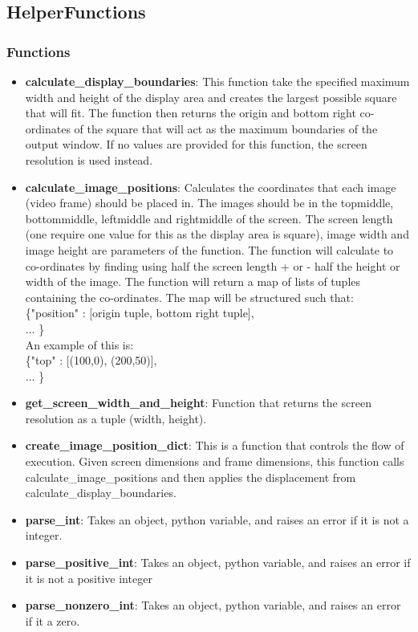 \documentclass{article}
\begin{document}
\subsection{HelperFunctions}
\subsubsection{Functions}

\begin{itemize}
	\item \textbf{calculate\_display\_boundaries}: This function take the specified maximum width and height of the display area and creates the largest possible square that will fit. The function then returns the origin and bottom right co-ordinates of the square that will act as the maximum boundaries of the output window. If no values are provided for this function, the screen resolution is used instead.
	
	\item \textbf{calculate\_image\_positions}: Calculates the co\-ordinates that each image (video frame) should be placed in. The images should be in the top\-middle, bottom\-middle, left\-middle and right\-middle of the screen. The screen length (one require one value for this as the display area is square), image width and image height are parameters of the function. The function will calculate to co-ordinates by finding using half the screen length + or - half the height or width of the image. The function will return a map of lists of tuples containing the co-ordinates. The map will be structured such that: \\
	\{"position" : [origin tuple, bottom right tuple],\\... \} \\
	An example of this is: \\
	\{"top" : [(100,0), (200,50)],\\... \}
	
	\item \textbf{get\_screen\_width\_and\_height}: Function that returns the screen resolution as a tuple (width, height). 
	
	\item \textbf{create\_image\_position\_dict}: This is a function that controls the flow of execution. Given screen dimensions and frame dimensions, this function calls calculate\_image\_positions and then applies the displacement from calculate\_display\_boundaries.  


	\item \textbf{parse\_int}: Takes an object, python variable, and raises an error if it is not a integer. 	
	
	\item \textbf{parse\_positive\_int}: Takes an object, python variable, and raises an error if it is not a positive integer

	\item \textbf{parse\_nonzero\_int}: Takes an object, python variable, and raises an error if it a zero. 

\end{itemize}
\end{document}

